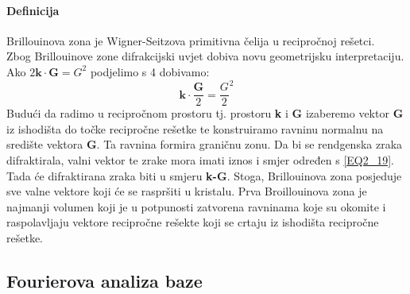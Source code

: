 \documentclass{article}
\numberwithin{equation}{section}
\begin{document}
\paragraph{Definicija} Brillouinova zona je Wigner-Seitzova primitivna čelija u recipročnoj rešetci.\\
Zbog Brillouinove zone difrakcijski uvjet dobiva novu geometrijsku interpretaciju. Ako $2\mathbf{k\cdot G}=G^2$ podjelimo s 4 dobivamo:
\begin{equation}
    \mathbf{k}\cdot \frac{\mathbf{G}}{2}={\frac{G}{2}}^2
    \label{EQ2_19}
\end{equation}
Budući da radimo u recipročnom prostoru tj. prostoru \textbf{k} i \textbf{G} izaberemo vektor \textbf{G} iz ishodišta do točke recipročne rešetke te konstruiramo ravninu normalnu na središte vektora \textbf{G}. Ta ravnina formira graničnu zonu. Da bi se rendgenska zraka difraktirala, valni vektor te zrake mora imati iznos i smjer određen s \ref{EQ2_19}. Tada će difraktirana zraka biti u smjeru \textbf{k-G}. Stoga, Brillouinova zona posjeduje sve valne vektore koji će se raspršiti u kristalu. Prva Broillouinova zona je najmanji volumen koji je u potpunosti zatvorena ravninama koje su okomite i raspolavljaju vektore recipročne rešekte koji se crtaju iz ishodišta recipročne rešetke.

\subsection{Fourierova analiza baze}
\end{document}
